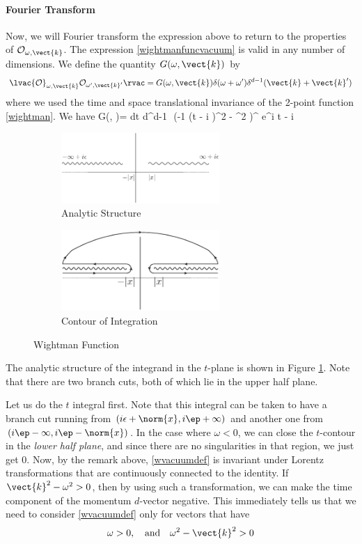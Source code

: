 \paragraph{Fourier Transform}
Now, we will Fourier transform the expression above to return to the properties of ${\cal O}_{\omega,\vect{k}}$.  The expression \eqref{wightmanfuncvacuum} is 
valid in any number of dimensions. We define the quantity $G(\omega,\vect{k})$ by
\[
\lvac {\cal O}_{\omega,\vect{k}} {\cal O}_{\omega',\vect{k}'}\rvac = G(\omega,\vect{k}) \delta(\omega+\omega')\delta^{d-1}(\vect{k}+\vect{k}')
\]
where we used the time and space translational invariance of the 2-point function \eqref{wightman}.
We have  
\be
\label{wvacuumdef}
G(\omega, )=  \int dt d^{d-1}\,\,  \left({-1 \over (t - i \epsilon)^2 - ^2} \right)^{\Delta} e^{i \omega t - i  \cdot {}}
\ee
\begin{figure}
\label{wightmanfuncfig}
\begin{center}
\begin{subfigure}[b]{6cm}
\includegraphics[width=6cm]{wightmananalyticfig.eps}
\caption{Analytic Structure}
\label{analyticwightman}
\end{subfigure}
\qquad
\qquad
\begin{subfigure}[b]{6cm}
\includegraphics[width=6cm]{wightmananalyticcontourfig.eps}
\caption{Contour of Integration}
\label{wvacontour} 
\end{subfigure}
\caption{Wightman Function}
\end{center}
\end{figure}
The analytic structure of the integrand in the $t$-plane is shown in Figure \ref{analyticwightman}. Note that there are two branch cuts, both of which lie in the upper half plane.

Let us do the $t$ integral first. Note that this integral can be taken to have a branch cut running from $(i \epsilon + \norm{x}, i \ep + \infty)$ and another one from $(i \ep - \infty, i \ep - \norm{x})$. In the case where $\omega < 0$, we can close the $t$-contour in the {\em lower half plane}, and since there are no singularities in that region, we just get $0$. Now, by the remark above, \eqref{wvacuumdef} is invariant under Lorentz transformations that are continuously connected to the identity. If $\vect{k}^2 - \omega^2 > 0$, then by using such a transformation, we can make the time component of the momentum $d$-vector negative. This immediately tells us that we need to consider \eqref{wvacuumdef} only for vectors that have
\[
\omega > 0, \quad \text{and} \quad \omega^2 - \vect{k}^2 > 0
\]

